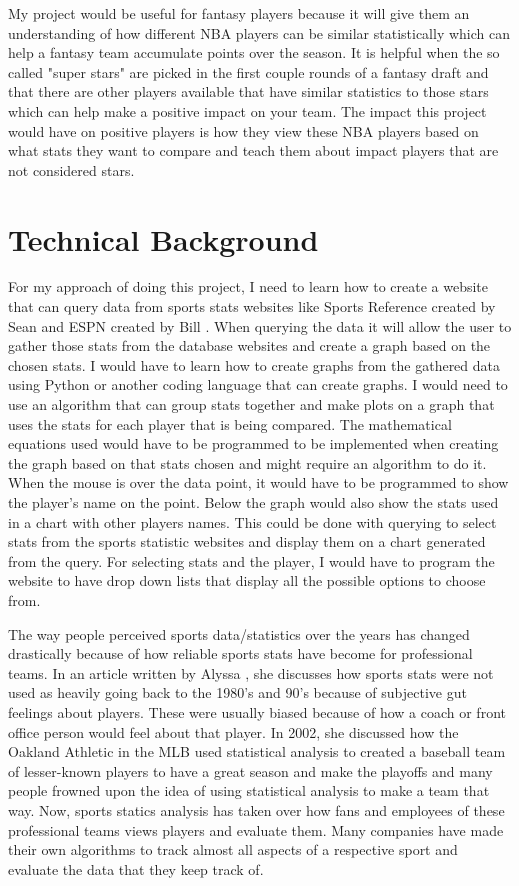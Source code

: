 \documentclass[10pt,twocolumn]{article}
\begin{document}
My project would be useful for fantasy players because it will give them an understanding of how different NBA players can be similar statistically which can help a fantasy team accumulate points over the season. It is helpful when the so called "super stars" are picked in the first couple rounds of a fantasy draft and that there are other players available that have similar statistics to those stars which can help make a positive impact on your team. The impact this project would have on positive players is how they view these NBA players based on what stats they want to compare and teach them about impact players that are not considered stars. 


\section{Technical Background}


For my approach of doing this project, I need to learn how to create a website that can query data from sports stats websites like Sports Reference created by Sean \textcite{sportsReference} and ESPN created by Bill \textcite{espn}. When querying the data it will allow the user to gather those stats from the database websites and create a graph based on the chosen stats. I would have to learn how to create graphs from the gathered data using Python or another coding language that can create graphs. I would need to use an algorithm that can group stats together and make plots on a graph that uses the stats for each player that is being compared. The mathematical equations used would have to be programmed to be implemented when creating the graph based on that stats chosen and might require an algorithm to do it. When the mouse is over the data point, it would have to be programmed to show the player's name on the point. Below the graph would also show the stats used in a chart with other players names. This could be done with querying to select stats from the sports statistic websites and display them on a chart generated from the query. For selecting stats and the player, I would have to program the website to have drop down lists that display all the possible options to choose from.

The way people perceived sports data/statistics over the years has changed drastically because of how reliable sports stats have become for professional teams. In an article written by Alyssa \textcite{sportsStats}, she discusses how sports stats were not used as heavily going back to the 1980's and 90's because of subjective gut feelings about players. These were usually biased because of how a coach or front office person would feel about that player. In 2002, she discussed how the Oakland Athletic in the MLB used statistical analysis to created a baseball team of lesser-known players to have a great season and make the playoffs and many people frowned upon the idea of using statistical analysis to make a team that way. Now, sports statics analysis has taken over how fans and employees of these professional teams views players and evaluate them. Many companies have made their own algorithms to track almost all aspects of a respective sport and evaluate the data that they keep track of. 
\end{document}
